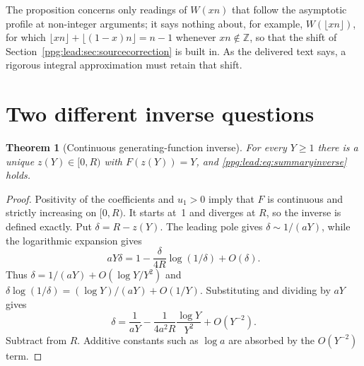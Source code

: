 \documentclass[11pt,letterpaper]{article}
\newtheorem{theorem}{Theorem}[section]
\theoremstyle{remark}\newtheorem{remark}[theorem]{Remark}
\numberwithin{equation}{section}
\begin{document}
The proposition concerns only readings of $W(xn)$ that follow the asymptotic profile at non-integer arguments; it says nothing about, for example, $W(\lfloor xn\rfloor)$, for which $\lfloor xn\rfloor+\lfloor(1-x)n\rfloor=n-1$ whenever $xn\notin\mathbb Z$, so that the shift of Section~\ref{ppg:lead:sec:sourcecorrection} is built in. As the delivered text says, a rigorous integral approximation must retain that shift.

\section{Two different inverse questions}\label{ppg:lead:sec:inverses}
\begin{theorem}[Continuous generating-function inverse]\label{ppg:lead:thm:GFinverse}
For every $Y\ge1$ there is a unique $z(Y)\in[0,R)$ with $F(z(Y))=Y$, and \eqref{ppg:lead:eq:summaryinverse} holds.
\end{theorem}
\begin{proof}
Positivity of the coefficients and $u_1>0$ imply that $F$ is continuous and strictly increasing on $[0,R)$. It starts at~1 and diverges at $R$, so the inverse is defined exactly. Put $\delta=R-z(Y)$. The leading pole gives $\delta\sim1/(aY)$, while the logarithmic expansion gives
\[
 aY\delta=1-\frac\delta{4R}\log(1/\delta)+O(\delta).
\]
Thus $\delta=1/(aY)+O(\log Y/Y^2)$ and
$\delta\log(1/\delta)=(\log Y)/(aY)+O(1/Y)$. Substituting and dividing by $aY$ gives
\[
 \delta=\frac1{aY}-\frac1{4a^2R}\frac{\log Y}{Y^2}+O(Y^{-2}).
\]
Subtract from $R$. Additive constants such as $\log a$ are absorbed by the $O(Y^{-2})$ term.
\end{proof}
\end{document}
